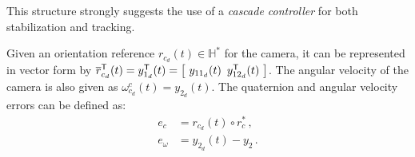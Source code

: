 This structure strongly suggests the use of a \textit{cascade controller} for both stabilization and tracking. 

Given an orientation reference $r_{c_d}(t) \in \mathbb{H}^*$ for the camera, it can be represented in vector form by $\overline{r}^\mathsf{T}_{c_d}(t) = y^\mathsf{T}_{1_d}(t) = \begin{bmatrix}\,\,y_{11_d}(t) \,\,\, y^\mathsf{T}_{12_d}(t) \,\,\end{bmatrix}$. 
%
The angular velocity of the camera is also given as $\omega^c_{c_d}(t) = y_{2_d}(t)$. 
%
The quaternion and angular velocity errors can be defined as:
%
\begin{align}
e_{c} &= r_{c_d}(t) \circ r^*_c \,, 
\label{eq:quaternion_errors1} \\
e_{\omega} &= y_{2_d}(t) - y_{2} \,.
\label{eq:quaternion_errors2}
\end{align}

